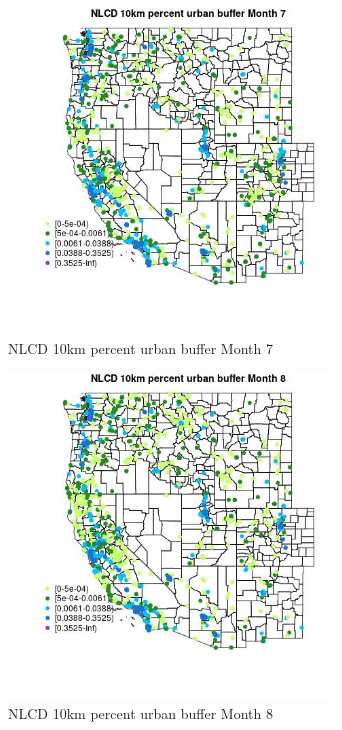 \begin{figure} 
\centering  
\includegraphics[width=0.77\textwidth]{Code_Outputs/Report_ML_input_PM25_Step4_part_f_de_duplicated_aveswNAs_MapObsMo7NLCD_10km_percent_urban_buffer.jpg} 
\caption{\label{fig:Report_ML_input_PM25_Step4_part_f_de_duplicated_aveswNAsMapObsMo7NLCD_10km_percent_urban_buffer}NLCD 10km percent urban buffer Month 7} 
\end{figure} 
 

\begin{figure} 
\centering  
\includegraphics[width=0.77\textwidth]{Code_Outputs/Report_ML_input_PM25_Step4_part_f_de_duplicated_aveswNAs_MapObsMo8NLCD_10km_percent_urban_buffer.jpg} 
\caption{\label{fig:Report_ML_input_PM25_Step4_part_f_de_duplicated_aveswNAsMapObsMo8NLCD_10km_percent_urban_buffer}NLCD 10km percent urban buffer Month 8} 
\end{figure} 
 

